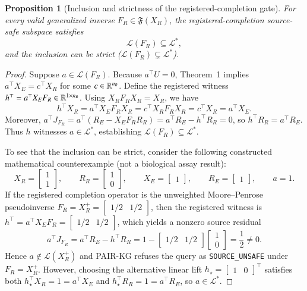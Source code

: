 \documentclass[11pt]{article}
\newtheorem{proposition}{Proposition}
\begin{document}
\begin{proposition}[Inclusion and strictness of the registered-completion gate]\label{prop:LFR_subset_Lstar}
For every valid generalized inverse $F_R \in \mathfrak{F}(X_R)$, the registered-completion source-safe subspace satisfies
\[
\mathcal{L}(F_R) \subseteq \mathcal{L}^*,
\]
and the inclusion can be strict ($\mathcal{L}(F_R) \subsetneq \mathcal{L}^*$).
\end{proposition}
\begin{proof}
Suppose $a \in \mathcal{L}(F_R)$. Because $a^\top U = 0$, Theorem~1 implies $a^\top X_E = c^\top X_R$ for some $c \in \mathbb{R}^{n_R}$. Define the registered witness $h^\top = a^\top X_E F_R \in \mathbb{R}^{1 \times n_R}$. Using $X_R F_R X_R = X_R$, we have
\[
h^\top X_R = a^\top X_E F_R X_R = c^\top X_R F_R X_R = c^\top X_R = a^\top X_E.
\]
Moreover, $a^\top J_{F_R} = a^\top (R_E - X_E F_R R_R) = a^\top R_E - h^\top R_R = 0$, so $h^\top R_R = a^\top R_E$. Thus $h$ witnesses $a \in \mathcal{L}^*$, establishing $\mathcal{L}(F_R) \subseteq \mathcal{L}^*$.

To see that the inclusion can be strict, consider the following constructed mathematical counterexample (not a biological assay result):
\[
X_R = \begin{bmatrix} 1 \\ 1 \end{bmatrix}, \qquad R_R = \begin{bmatrix} 1 \\ 0 \end{bmatrix}, \qquad X_E = \begin{bmatrix} 1 \end{bmatrix}, \qquad R_E = \begin{bmatrix} 1 \end{bmatrix}, \qquad a = 1.
\]
If the registered completion operator is the unweighted Moore--Penrose pseudoinverse $F_R = X_R^+ = \begin{bmatrix} 1/2 & 1/2 \end{bmatrix}$, then the registered witness is $h^\top = a^\top X_E F_R = \begin{bmatrix} 1/2 & 1/2 \end{bmatrix}$, which yields a nonzero source residual
\[
a^\top J_{F_R} = a^\top R_E - h^\top R_R = 1 - \begin{bmatrix} 1/2 & 1/2 \end{bmatrix}\begin{bmatrix} 1 \\ 0 \end{bmatrix} = \frac{1}{2} \neq 0.
\]
Hence $a \notin \mathcal{L}(X_R^+)$ and PAIR-KG refuses the query as \texttt{SOURCE\_UNSAFE} under $F_R = X_R^+$. However, choosing the alternative linear lift $h_\star = \begin{bmatrix} 1 & 0 \end{bmatrix}^\top$ satisfies both $h_\star^\top X_R = 1 = a^\top X_E$ and $h_\star^\top R_R = 1 = a^\top R_E$, so $a \in \mathcal{L}^*$.
\end{proof}
\end{document}
